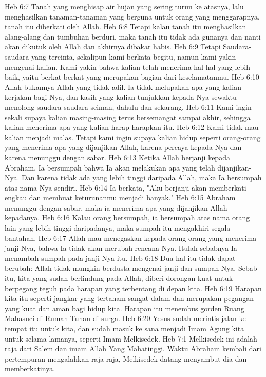Heb 6:7  Tanah yang menghisap air hujan yang sering turun ke atasnya, lalu menghasilkan tanaman-tanaman yang berguna untuk orang yang menggarapnya, tanah itu diberkati oleh Allah.
Heb 6:8  Tetapi kalau tanah itu menghasilkan alang-alang dan tumbuhan berduri, maka tanah itu tidak ada gunanya dan nanti akan dikutuk oleh Allah dan akhirnya dibakar habis.
Heb 6:9  Tetapi Saudara-saudara yang tercinta, sekalipun kami berkata begitu, namun kami yakin mengenai kalian. Kami yakin bahwa kalian telah menerima hal-hal yang lebih baik, yaitu berkat-berkat yang merupakan bagian dari keselamatanmu.
Heb 6:10  Allah bukannya Allah yang tidak adil. Ia tidak melupakan apa yang kalian kerjakan bagi-Nya, dan kasih yang kalian tunjukkan kepada-Nya sewaktu menolong saudara-saudara seiman, dahulu dan sekarang.
Heb 6:11  Kami ingin sekali supaya kalian masing-masing terus bersemangat sampai akhir, sehingga kalian menerima apa yang kalian harap-harapkan itu.
Heb 6:12  Kami tidak mau kalian menjadi malas. Tetapi kami ingin supaya kalian hidup seperti orang-orang yang menerima apa yang dijanjikan Allah, karena percaya kepada-Nya dan karena menunggu dengan sabar.
Heb 6:13  Ketika Allah berjanji kepada Abraham, Ia bersumpah bahwa Ia akan melakukan apa yang telah dijanjikan-Nya. Dan karena tidak ada yang lebih tinggi daripada Allah, maka Ia bersumpah atas nama-Nya sendiri.
Heb 6:14  Ia berkata, "Aku berjanji akan memberkati engkau dan membuat keturunanmu menjadi banyak."
Heb 6:15  Abraham menunggu dengan sabar, maka ia menerima apa yang dijanjikan Allah kepadanya.
Heb 6:16  Kalau orang bersumpah, ia bersumpah atas nama orang lain yang lebih tinggi daripadanya, maka sumpah itu mengakhiri segala bantahan.
Heb 6:17  Allah mau menegaskan kepada orang-orang yang menerima janji-Nya, bahwa Ia tidak akan merubah rencana-Nya. Itulah sebabnya Ia menambah sumpah pada janji-Nya itu.
Heb 6:18  Dua hal itu tidak dapat berubah: Allah tidak mungkin berdusta mengenai janji dan sumpah-Nya. Sebab itu, kita yang sudah berlindung pada Allah, diberi dorongan kuat untuk berpegang teguh pada harapan yang terbentang di depan kita.
Heb 6:19  Harapan kita itu seperti jangkar yang tertanam sangat dalam dan merupakan pegangan yang kuat dan aman bagi hidup kita. Harapan itu menembus gorden Ruang Mahasuci di Rumah Tuhan di surga.
Heb 6:20  Yesus sudah merintis jalan ke tempat itu untuk kita, dan sudah masuk ke sana menjadi Imam Agung kita untuk selama-lamanya, seperti Imam Melkisedek.
Heb 7:1  Melkisedek ini adalah raja dari Salem dan imam Allah Yang Mahatinggi. Waktu Abraham kembali dari pertempuran mengalahkan raja-raja, Melkisedek datang menyambut dia dan memberkatinya.
